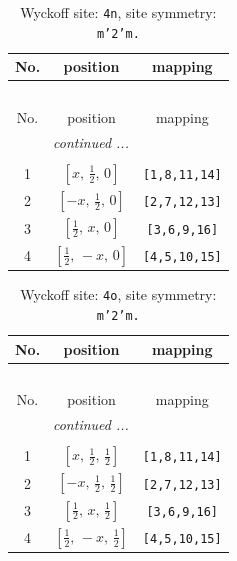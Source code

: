 \documentclass[fleqn,8pt]{jsarticle}
\begin{document}
\renewcommand{\arraystretch}{1.2}
\begin{longtable}{ccc}
\caption{Wyckoff site: {\tt 4n}, site symmetry: {\tt m'2'm.}}
 \\
 \hline \hline
No. & position & mapping \\ \hline \endfirsthead

\multicolumn{2}{l}{\tablename\ \thetable{}} \\
 \hline \hline
No. & position & mapping \\ \hline \endhead

 \hline \hline
\multicolumn{2}{r}{\footnotesize\it continued ...} \\ \endfoot

 \hline \hline
\multicolumn{2}{r}{} \\ \endlastfoot

1 & $\left[ x,\, \frac{1}{2},\, 0 \right]$ & {\tt [1,8,11,14]} \\ \hline
2 & $\left[ - x,\, \frac{1}{2},\, 0 \right]$ & {\tt [2,7,12,13]} \\ \hline
3 & $\left[ \frac{1}{2},\, x,\, 0 \right]$ & {\tt [3,6,9,16]} \\ \hline
4 & $\left[ \frac{1}{2},\, - x,\, 0 \right]$ & {\tt [4,5,10,15]} \\
\end{longtable}
\renewcommand{\arraystretch}{1.2}
\begin{longtable}{ccc}
\caption{Wyckoff site: {\tt 4o}, site symmetry: {\tt m'2'm.}}
 \\
 \hline \hline
No. & position & mapping \\ \hline \endfirsthead

\multicolumn{2}{l}{\tablename\ \thetable{}} \\
 \hline \hline
No. & position & mapping \\ \hline \endhead

 \hline \hline
\multicolumn{2}{r}{\footnotesize\it continued ...} \\ \endfoot

 \hline \hline
\multicolumn{2}{r}{} \\ \endlastfoot

1 & $\left[ x,\, \frac{1}{2},\, \frac{1}{2} \right]$ & {\tt [1,8,11,14]} \\ \hline
2 & $\left[ - x,\, \frac{1}{2},\, \frac{1}{2} \right]$ & {\tt [2,7,12,13]} \\ \hline
3 & $\left[ \frac{1}{2},\, x,\, \frac{1}{2} \right]$ & {\tt [3,6,9,16]} \\ \hline
4 & $\left[ \frac{1}{2},\, - x,\, \frac{1}{2} \right]$ & {\tt [4,5,10,15]} \\
\end{longtable}
\end{document}
